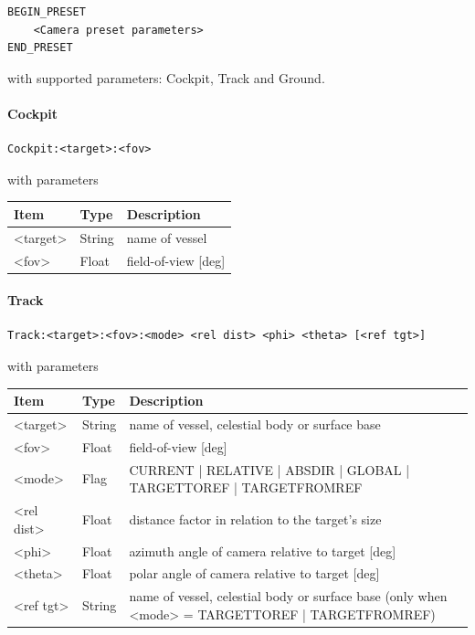 \documentclass[Orbiter Developer Manual.tex]{subfiles}
\begin{document}
\begin{lstlisting}[language=OSFS]
BEGIN_PRESET
	<Camera preset parameters>
END_PRESET
\end{lstlisting}

\noindent
with supported parameters: Cockpit, Track and Ground.

\paragraph{Cockpit}
\begin{lstlisting}[language=OSFS]
Cockpit:<target>:<fov>
\end{lstlisting}

\noindent
with parameters

\begin{table}[H]
	\centering
	\begin{tabularx}{\textwidth}{ |l|l|X| }
	\hline\rule{0pt}{2ex}
	\textbf{Item} & \textbf{Type} & \textbf{Description}\\
	\hline\rule{0pt}{2ex}
	<target> & String & name of vessel\\
	\hline\rule{0pt}{2ex}
	<fov> & Float & field-of-view [deg]\\
	\hline
	\end{tabularx}
\end{table}

\paragraph{Track}
\begin{lstlisting}[language=OSFS]
Track:<target>:<fov>:<mode> <rel dist> <phi> <theta> [<ref tgt>]
\end{lstlisting}

\noindent
with parameters

\begin{table}[H]
	\centering
	\begin{tabularx}{\textwidth}{ |l|l|X| }
	\hline\rule{0pt}{2ex}
	\textbf{Item} & \textbf{Type} & \textbf{Description}\\
	\hline\rule{0pt}{2ex}
	<target> & String & name of vessel, celestial body or surface base\\
	\hline\rule{0pt}{2ex}
	<fov> & Float & field-of-view [deg]\\
	\hline\rule{0pt}{2ex}
	<mode> & Flag & CURRENT | RELATIVE | ABSDIR | GLOBAL | TARGETTOREF | TARGETFROMREF\\
	\hline\rule{0pt}{2ex}
	<rel dist> & Float & distance factor in relation to the target's size\\
	\hline\rule{0pt}{2ex}
	<phi> & Float & azimuth angle of camera relative to target [deg]\\
	\hline\rule{0pt}{2ex}
	<theta> & Float & polar angle of camera relative to target [deg]\\
	\hline\rule{0pt}{2ex}
	<ref tgt> & String & name of vessel, celestial body or surface base (only when <mode> = TARGETTOREF | TARGETFROMREF)\\
	\hline
	\end{tabularx}
\end{table}
\end{document}
